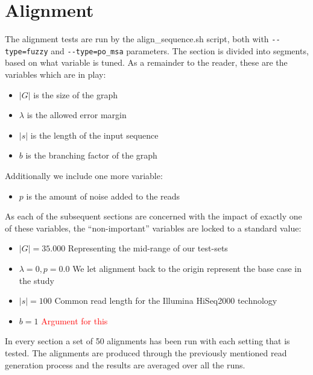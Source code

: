 \documentclass[thesis.tex]{subfiles}
\begin{document}
\section{Alignment}
The alignment tests are run by the align\_sequence.sh script, both with \texttt{-{}-type=fuzzy} and \texttt{-{}-type=po\_msa} parameters. The section is divided into segments, based on what variable is tuned. As a remainder to the reader, these are the variables which are in play:
\begin{itemize}
  \item $|G|$ is the size of the graph
  \item $\lambda$ is the allowed error margin
  \item $|s|$ is the length of the input sequence
  \item $b$ is the branching factor of the graph
\end{itemize}
Additionally we include one more variable:
\begin{itemize}
  \item $p$ is the amount of noise added to the reads
\end{itemize}
As each of the subsequent sections are concerned with the impact of exactly one of these variables, the ``non-important'' variables are locked to a standard value:
\begin{itemize}
  \item \textbf{$|G|=35.000$} Representing the mid-range of our test-sets
  \item \textbf{$\lambda=0, p=0.0$} We let alignment back to the origin represent the base case in the study
  \item \textbf{$|s|=100$} Common read length for the Illumina HiSeq2000 technology
  \item \textbf{$b=1$} \textcolor{red}{Argument for this}
\end{itemize}
In every section a set of 50 alignments has been run with each setting that is tested. The alignments are produced through the previously mentioned read generation process and the results are averaged over all the runs.
\end{document}
